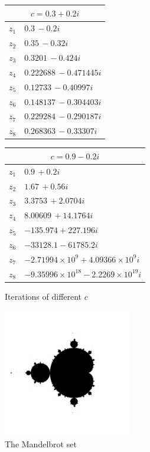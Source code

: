 \documentclass[12pt,a4paper,titlepage]{article}
\begin{document}
	\begin{figure}
		\centering
		\caption{Iterations of different \(c\)}
		\label{fig:iterations_mandelbrot}
		\begin{minipage}{.45\textwidth}
			\centering
			\begin{tabular}{c|l}
				\multicolumn{2}{c}{\(c=0.3+0.2i\)} \\ \hline
				\(z_1\)& \(0.3\, -0.2 i\)\\ \hline
				\(z_2\)& \(0.35\, -0.32 i\)\\ \hline
				\(z_3\)& \(0.3201\, -0.424 i\)\\ \hline
				\(z_4\)& \(0.222688\, -0.471445 i\)\\ \hline
				\(z_5\)& \(0.12733\, -0.40997 i\)\\ \hline
				\(z_6\)& \(0.148137\, -0.304403 i\)\\ \hline
				\(z_7\)& \(0.229284\, -0.290187 i\)\\ \hline
				\(z_8\)& \(0.268363\, -0.33307 i \)\\ \hline
			\end{tabular}
		\end{minipage}
		\begin{minipage}{.45\textwidth}
			\centering
			\begin{tabular}{c|l}
				\multicolumn{2}{c}{\(c=0.9-0.2i\)} \\ \hline
				\(z_1\)& \(0.9\, + 0.2 i\)            \\ \hline
				\(z_2\)& \(1.67\, +0.56 i\)            \\ \hline
				\(z_3\)& \(3.3753\, +2.0704 i\)           \\ \hline
				\(z_4\)& \(8.00609\, +14.1764 i\)            \\ \hline
				\(z_5\)& \(-135.974+227.196 i\)            \\ \hline
				\(z_6\)& \(-33128.1-61785.2 i\) \\ \hline
				\(z_7\)& \(-2.71994\times 10^9+4.09366\times 10^9 i\)           \\ \hline
				\(z_8\)& \(-9.35996\times 10^{18}-2.2269\times 10^{19} i\) \\ \hline
			\end{tabular}
		\end{minipage}
	\end{figure}
	\begin{figure}
		\caption{The Mandelbrot set}
		\label{fig:mandelbrot}
		\centering
		\includegraphics[width=0.5\textwidth]{"res/images/mandelbrot.png"}
	\end{figure}
\end{document}
